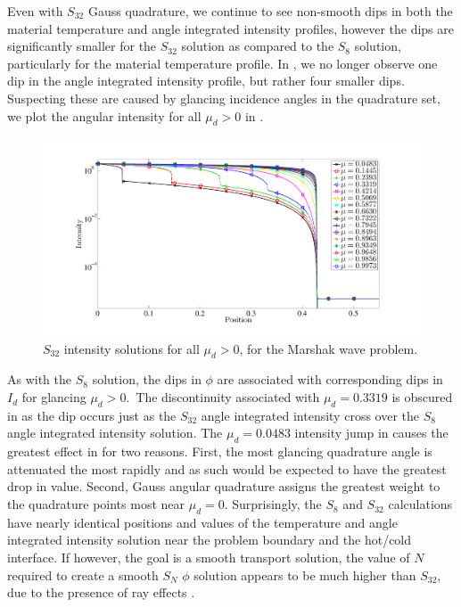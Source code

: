 Even with $S_{32}$ Gauss quadrature, we continue to see non-smooth dips in both the material temperature and angle integrated intensity profiles, however the dips are significantly smaller for the $S_{32}$ solution as compared to the $S_8$ solution, particularly for the material temperature profile.
In , we no longer observe one dip in the angle integrated intensity profile, but rather four smaller dips.
Suspecting these are caused by glancing incidence angles in the quadrature set, we plot the angular intensity for all $\mu_d > 0$ in .
\begin{figure}[!htp]
\centering
\includegraphics[width=16cm,trim=1.5in  0.2in 0.5in 0.75in,clip=true]{chapter6_grey_radtran/Dissertation_Data/S32_Intensity.pdf}
\caption{$S_{32}$ intensity solutions for all $\mu_d > 0$, for the Marshak wave problem.}
\label{fig:s32_intensity}
\end{figure}
As with the $S_8$ solution, the dips in $\phi$ are associated with corresponding dips in $I_d$ for glancing $\mu_d>0$.\
The discontinuity associated with $\mu_d = 0.3319$ is obscured in  as the dip occurs just as the $S_{32}$ angle integrated intensity cross over the $S_8$ angle integrated intensity solution.
The $\mu_d=0.0483$ intensity jump in \fig{fig:s32_intensity} causes the greatest effect in \fig{fig:s8_vs_s32_radiation} for two reasons.  
First, the most glancing quadrature angle is attenuated the most rapidly and as such would be expected to have the greatest drop in value.
Second, Gauss angular quadrature assigns the greatest weight to the quadrature points most near $\mu_d = 0$. 
Surprisingly, the $S_8$ and $S_{32}$ calculations have nearly identical positions and values of the temperature and angle integrated intensity solution near the problem boundary and the hot/cold interface.  
If however, the goal is a smooth transport solution, the value of $N$ required to create a smooth $S_N$ $\phi$ solution appears to be much higher than $S_{32}$, due to the presence of ray effects \cite{lewis_book}.

